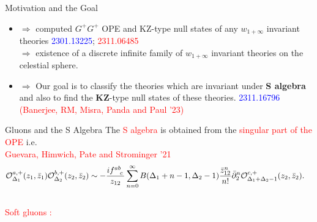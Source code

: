 \documentclass[final]{beamer}
\newlength{\colwidth}
\begin{document}
\begin{frame}[t]
\begin{columns}[t]
\begin{column}{\colwidth}
	    \begin{block}{Motivation and the Goal}
	    	\begin{itemize}
	    		\item [\ding{71}] \boxed{\textbf{\textcolor{red}{Banerjee, Kulkarni and Paul '23}}}
	    		$\Rightarrow$ computed $G^{+}G^{+}$ OPE and KZ-type null states of any $w_{1+\infty}$ invariant theories \hspace{16cm}\textcolor{blue}{2301.13225}; \textcolor{red}{2311.06485}
	    		\vspace{2mm}\\
	    		$\Rightarrow$ existence of a discrete infinite family of $w_{1+\infty}$ invariant theories on the celestial sphere.
	    		\vspace{2mm}\\
	    		\item[\ding{71}] \boxed{\textbf{\textcolor{red}{Goal}}}
	    		$\Rightarrow$
	    		Our goal is to classify the theories which are invariant under \textbf{S algebra} and also to find the \textbf{KZ}-type null states of these theories.  \hspace{5.6cm} \textcolor{blue}{2311.16796}
	    		\\
	    		\hspace{20cm} \textcolor{red}{\small{(Banerjee, RM, Misra, Panda and Paul '23)}}
	    	\end{itemize}
	    \end{block}
		\begin{block}{Gluons and the S Algebra}
				The \textcolor{red}{S algebra} is obtained from the \textcolor{red}{singular part of the OPE} i.e. 
			\\
			\hspace{21cm}\textcolor{red}{\small{Guevara, Himwich, Pate and Strominger '21 }}
			\begin{equation}
				\label{eq:soft4}
				\begin{split}
					&\mathcal{O}^{a,+}_{\Delta_{1}}(z_{1},\bar{z}_{1}) \mathcal{O}^{b,+}_{\Delta_{2}}(z_{2},\bar{z}_{2})
					\sim -\frac{i\tensor{f}{^a^b_c}}{z_{12}}\sum_{n=0}^{\infty}B(\Delta_{1}+n-1,\Delta_{2}-1)\frac{\bar{z}^{n}_{12}}{n!}\bar\partial^{n}_{2}\mathcal{O}^{c,+}_{\Delta_{1}+\Delta_{2}-1}(z_{2},\bar{z}_{2}).
				\end{split}
			\end{equation}
			\\
			\textcolor{red}{Soft gluons :}

\end{block}
\end{column}
\end{columns}
\end{frame}
\end{document}
